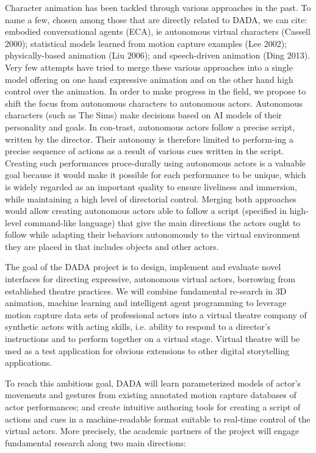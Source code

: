 Character animation has been tackled through various approaches in the past. To name a few, chosen among those that are directly related to DADA, we can cite: embodied conversational agents (ECA), ie autonomous virtual characters (Cassell 2000); statistical models learned from motion capture examples (Lee 2002); physically-based animation (Liu 2006); and speech-driven animation (Ding 2013). Very few attempts have tried to merge these various approaches into a single model offering on one hand expressive animation and on the other hand high control over the animation.
In order to make progress in the field, we propose to shift the focus from autonomous characters to autonomous actors. Autonomous characters (such as The Sims) make decisions based on AI models of their personality and goals. In con-trast, autonomous actors follow a precise script, written by the director. Their autonomy is therefore limited to perform-ing a precise sequence of actions as a result of various cues  written in the script. Creating such performances proce-durally using autonomous actors is a valuable goal because it would make it possible for each performance to be unique, which is widely regarded as an important quality to ensure liveliness and immersion, while maintaining a high level of directorial control. Merging both approaches would allow creating autonomous actors able to follow a script (specified in high-level command-like language) that give the main directions the actors ought to follow while adapting their behaviors autonomously to the virtual environment they are placed in that 
includes objects and other actors.

The goal of the DADA project is to design, implement and evaluate novel interfaces for directing expressive, autonomous virtual actors, borrowing from established theatre practices. We will combine fundamental re-search in 3D animation, machine learning and intelligent agent programming to leverage motion capture data sets of professional actors into a virtual theatre company of synthetic actors with acting skills, i.e. ability to respond to a director's instructions and to perform together on a virtual stage. Virtual theatre will be used as a test application for obvious extensions to other digital storytelling applications.

To reach this ambitious goal, DADA will learn parameterized models of actor's movements and gestures from existing annotated motion capture databases of actor performances; and create intuitive authoring tools for creating a script of actions and cues in a machine-readable format suitable to real-time control of the virtual actors. More precisely, the academic partners of the project will engage fundamental research along two main directions:


